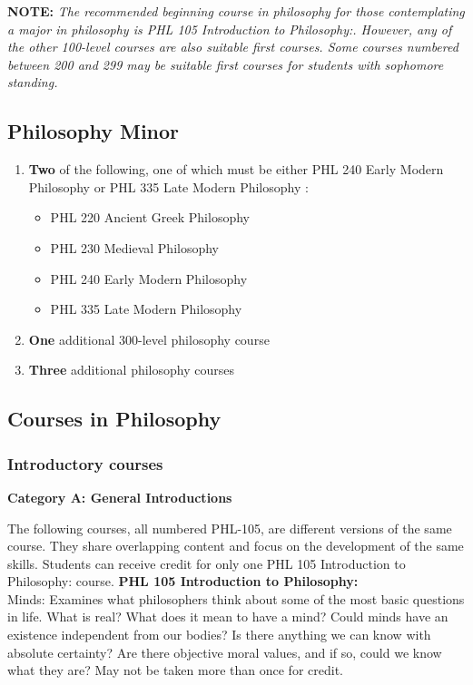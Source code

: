 \documentclass[
  letterpaper,
]{scrbook}
\providecommand{\tightlist}{%
  \setlength{\itemsep}{0pt}\setlength{\parskip}{0pt}}
\begin{document}
\textbf{NOTE:} \emph{The recommended beginning course in philosophy for
those contemplating a major in philosophy is PHL 105 Introduction to
Philosophy:. However, any of the other 100-level courses are also
suitable first courses. Some courses numbered between 200 and 299 may be
suitable first courses for students with sophomore standing.}

\subsection{Philosophy Minor}\label{philosophy-minor}

\begin{enumerate}
\def\labelenumi{\arabic{enumi}.}
\item
  \textbf{Two} of the following, one of which must be either PHL 240
  Early Modern Philosophy or PHL 335 Late Modern Philosophy :

  \begin{itemize}
  \tightlist
  \item
    PHL 220 Ancient Greek Philosophy
  \item
    PHL 230 Medieval Philosophy
  \item
    PHL 240 Early Modern Philosophy
  \item
    PHL 335 Late Modern Philosophy
  \end{itemize}
\item
  \textbf{One} additional 300-level philosophy course
\item
  \textbf{Three} additional philosophy courses
\end{enumerate}

\subsection{Courses in Philosophy}\label{courses-in-philosophy}

\subsubsection*{Introductory courses}\label{introductory-courses}

\textbf{Category A: General Introductions}

The following courses, all numbered PHL-105, are different versions of
the same course. They share overlapping content and focus on the
development of the same skills. Students can receive credit for only one
PHL 105 Introduction to Philosophy: course. \textbf{PHL 105 Introduction
to Philosophy:}\\
Minds: Examines what philosophers think about some of the most basic
questions in life. What is real? What does it mean to have a mind? Could
minds have an existence independent from our bodies? Is there anything
we can know with absolute certainty? Are there objective moral values,
and if so, could we know what they are? May not be taken more than once
for credit.
\end{document}
